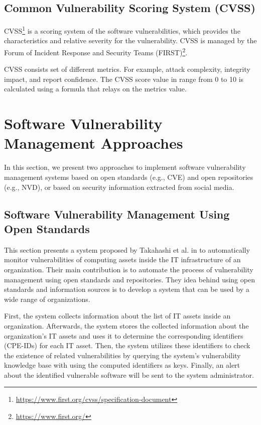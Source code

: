 \documentclass{llncs}
\begin{document}
  
 \subsection{Common Vulnerability Scoring System (CVSS)}
 
 \par CVSS\footnote{\url{https://www.first.org/cvss/specification-document}} is a scoring system of the software  vulnerabilities, which provides the characteristics and relative severity for the vulnerability. CVSS is managed by the Forum of Incident Response and Security Teams (FIRST)\footnote{\url{https://www.first.org/}}.
 
 \par CVSS consists set of different metrics. For example, attack complexity, integrity impact, and report confidence. The CVSS score value in range from 0 to 10  is calculated using a formula that relays on the metrics value.

\section{Software	Vulnerability	Management	Approaches}
 
 In this section, we present two approaches to implement software vulnerability management systems based on  open standards (e.g., CVE) and open repositories (e.g., NVD), or based on  security information extracted from social media.
\subsection{Software	Vulnerability	Management	Using	Open	Standards}

\par This section presents a system proposed by Takahashi et al. in \cite{paper1} to automatically monitor vulnerabilities of computing assets inside the IT infrastructure of an organization. Their main contribution is to automate the process of vulnerability management using open standards and repositories. They idea behind using open standards and information sources is to develop a system that can be used  by a wide range of organizations.
\par
 First, the system collects information about the list of IT assets inside an organization. Afterwards, the system stores the collected information about the organization's IT assets and uses it to determine the corresponding  identifiers (CPE-IDs) for each IT asset. Then, the system utilizes these identifiers to check the existence of related vulnerabilities by querying the system's vulnerability knowledge base with using the computed identifiers as keys. Finally, an alert about the identified vulnerable software will be sent to the system administrator.
    
\end{document}
